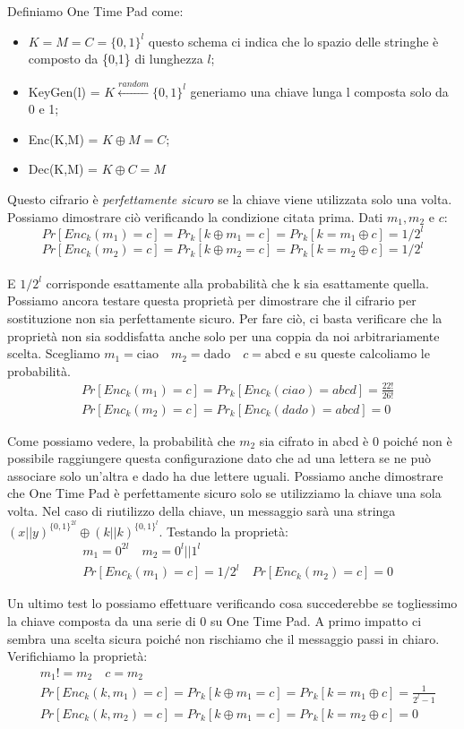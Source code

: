 Definiamo One Time Pad come:
\begin{itemize}
    \item $K=M=C=\{0,1\}^l$ questo schema ci indica che lo spazio delle stringhe è composto da \{0,1\} di lunghezza $l$;
    \item KeyGen(l) = $K \xleftarrow{random}\{0,1\}^l$ generiamo una chiave lunga l composta solo da 0 e 1;
    \item Enc(K,M) = $K \oplus M = C$; 
    \item Dec(K,M) = $K\oplus C = M$
\end{itemize}
Questo cifrario è \textit{perfettamente sicuro} se la chiave viene utilizzata solo una volta. Possiamo dimostrare ciò verificando la condizione citata prima.
Dati $m_1,m_2$ e $c$:
\[Pr[Enc_k(m_1)=c] = Pr_k[k\oplus m_1 =c] = Pr_k[k = m_1 \oplus c] = 1/2^l\]
\[Pr[Enc_k(m_2)=c] = Pr_k[k\oplus m_2 =c] = Pr_k[k = m_2 \oplus c] = 1/2^l\]
\\
E $1/2^l$ corrisponde esattamente alla probabilità che k sia esattamente quella. Possiamo ancora testare questa proprietà per dimostrare che il cifrario per sostituzione non sia perfettamente sicuro. Per fare ciò, ci basta verificare che la proprietà non sia soddisfatta anche solo per una coppia da noi arbitrariamente scelta. 
Scegliamo $m_1 = \text{ciao} \quad m_2=\text{dado} \quad c=\text{abcd}$ e su queste calcoliamo le probabilità.
\begin{align*}
    &Pr[Enc_k (m_1)=c] = Pr_k[Enc_k(ciao)= abcd] = \frac{22!}{26!}\\
    &Pr[Enc_k (m_2)=c] = Pr_k[Enc_k (dado)=abcd] = 0
\end{align*}

Come possiamo vedere, la probabilità che $m_2$ sia cifrato in abcd è 0 poiché non è possibile raggiungere questa configurazione dato che ad una lettera se ne può associare solo un'altra e dado ha due lettere uguali.
Possiamo anche dimostrare che One Time Pad è perfettamente sicuro solo se utilizziamo la chiave una sola volta. Nel caso di riutilizzo della chiave, un messaggio sarà una stringa $(x||y)^{\{0,1\}^{2l}} \oplus (k||k)^{\{0,1\}^{l}}$. Testando la proprietà:
\begin{align*}
    &m_1=0^{2l} \quad m_2 = 0^l||1^l\\
    &Pr[Enc_k(m_1)=c] = 1/2^l \quad Pr[Enc_k(m_2)=c] =0
\end{align*}

Un ultimo test lo possiamo effettuare verificando cosa succederebbe se togliessimo la chiave composta da una serie di 0 su One Time Pad. A primo impatto ci sembra una scelta sicura poiché non rischiamo che il messaggio passi in chiaro. Verifichiamo la proprietà:
\begin{align*}
    &m_1!=m_2 \quad c=m_2\\
    &Pr[Enc_k(k,m_1)=c] = Pr_k[k\oplus m_1 = c] = Pr_k[k = m_1 \oplus c] = \frac{1}{2^l-1}\\
    &Pr[Enc_k(k,m_2)=c] = Pr_k[k\oplus m_1 = c] = Pr_k[k = m_2 \oplus c] = 0
\end{align*}

